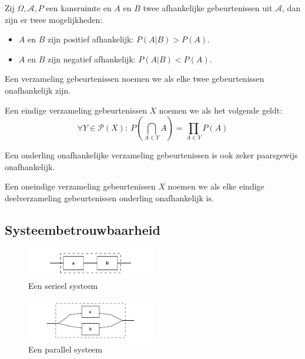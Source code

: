 \documentclass[main.tex]{subfiles}
\begin{document}
\begin{st}
  Zij $\Omega,\mathcal{A},P$ een kansruimte en $A$ en $B$ twee afhankelijke gebeurtenissen uit $\mathcal{A}$, dan zijn er twee mogelijkheden:
  \begin{itemize}
  \item $A$ en $B$ zijn positief afhankelijk: $P(A|B) > P(A)$.
  \item $A$ en $B$ zijn negatief afhankelijk: $P(A|B) < P(A)$.
  \end{itemize}
\end{st}

\begin{de}
  Een verzameling gebeurtenissen noemen we  als elke twee gebeurtenissen onafhankelijk zijn.
\end{de}

\begin{de}
  Een eindige verzameling gebeurtenissen $X$ noemen we  als het volgende geldt:
  \[ \forall Y\in \mathcal{P}(X):\ P\left( \bigcap_{A\in Y}A \right) = \prod_{A\in Y}P(A) \]
\end{de}

\begin{ei}
  Een onderling onafhankelijke verzameling gebeurtenissen is ook zeker paarsgewijs onafhankelijk.
\end{ei}

\begin{de}
  Een oneindige verzameling gebeurtenissen $X$ noemen we  als elke eindige deelverzameling gebeurtenissen onderling onafhankelijk is.
\end{de}

\subsection{Systeembetrouwbaarheid}
\label{sec:syst}

\begin{figure}[H]
  \caption{Een serieel systeem}
  \centering
    \includegraphics[width=0.5\textwidth]{assets/systeem-serieel.png}
\end{figure}

\begin{figure}[H]
  \caption{Een parallel systeem}
  \centering
    \includegraphics[width=0.5\textwidth]{assets/systeem-parallel.png}
\end{figure}
\end{document}
